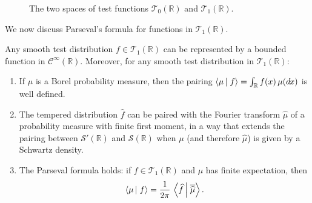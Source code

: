 \documentclass[envcountsame]{svmult}
\newcommand{\R}{\mathbb{R}}
\newcommand{\leb}{\mathrm{L}}
\newcommand{\testf}{\mathscr{T}}
\newcommand{\schwartz}{\mathscr{S}}
\newcommand{\scal}[2]{\left\langle #1\vphantom{#2}\,\right |\left.#2 \vphantom{#1}\right\rangle}
\newcommand{\DD}[1]{\,d\hspace*{-0.3mm}{#1}}
\begin{document}
\begin{figure}[ht]
\begin{center}
\caption{The two spaces of test functions $\testf_0(\R)$ and $\testf_1(\R)$.}
\end{center}
\end{figure}
We now discuss Parseval's formula for functions in $\testf_1(\R)$.
\begin{proposition}\label{prop:parsevaldistribution}
Any smooth test distribution $f \in \testf_1(\R)$ can be represented by a bounded function in $\mathscr{C}^\infty(\R)$. 
Moreover, for any smooth test distribution in $\testf_1(\R)$:
 \begin{enumerate}[label=(TD\arabic*)]
    \item\label{item:distribution1} If $\mu$ is a Borel probability measure, then the pairing $\scal{\mu}{f} = \int_{\R} f(x)\,\mu(\!\DD{x})$ is well defined.
    \item\label{item:distribution2} The tempered distribution $\widehat{f}$ can be paired with the Fourier transform $\widehat{\mu}$ of a probability measure with finite first moment, in a way that extends the pairing between $\schwartz'(\R)$ and $\schwartz(\R)$ when $\mu$ (and therefore $\widehat{\mu}$) is given by a Schwartz density.
    \item\label{item:distribution3} The Parseval formula holds: if $f \in \testf_1(\R)$ and $\mu$ has finite expectation, then
    $$\scal{\mu}{f} = \frac{1}{2\pi}\,\scal{\widehat{f}}{\overline{\widehat{\mu}}} .$$
 \end{enumerate}
\end{proposition}
\end{document}
